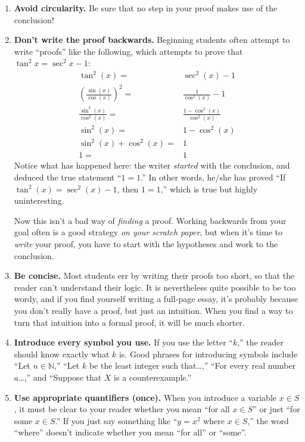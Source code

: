\begin{enumerate}
\item \textbf{Avoid circularity.}  Be sure that no step in your proof makes use of the conclusion!

\item \textbf{Don't write the proof backwards.} Beginning students often attempt to write ``proofs'' like the following, which attempts to prove that \(\tan^2 x  = \sec^2 x - 1\):
\begin{align*}
\tan^2(x) =& \sec^2(x) - 1 \\
\left(\frac{\sin(x)}{\cos(x)}\right)^2 =& \frac{1}{\cos^2(x)} - 1 \\
\frac{\sin^2(x)}{\cos^2(x)} =&  \frac{1-\cos^2(x)}{\cos^2(x)} \\
\sin^2(x) =& 1-\cos^2(x) \\
\sin^2(x) + \cos^2(x) =& 1 \\
1 =& 1
\end{align*}
Notice what has happened here:  the writer \emph{started} with the conclusion, and deduced the true statement ``\(1=1\).'' In other words, he/she has proved ``If \(\tan^2(x) = \sec^2(x) - 1\), then \(1=1\),'' which is true but highly uninteresting.

Now this isn't a bad way of \emph{finding} a proof.
Working backwards from your goal often is a good strategy \emph{on your scratch paper},
but when it's time to \emph{write} your proof,
you have to start with the hypotheses and work to the conclusion.

\item \textbf{Be concise.} Most students err by writing their proofs too short, so that the reader can't understand their logic. It is nevertheless quite possible to be too wordy, and if you find yourself writing a full-page essay, it's probably because you don't really have a proof, but just an intuition. When you find a way to turn that intuition into a formal proof, it will be much shorter.

\item \textbf{Introduce every symbol you use.} If you use the letter ``\(k\),'' the reader should know exactly what \(k\) is. Good phrases for introducing symbols include ``Let \(n\in \mathbb{N}\),'' ``Let \(k\) be the least integer such that\ldots,'' ``For every real number \(a\)\ldots,'' and ``Suppose that \(X\) is a counterexample.''
  
\item \textbf{Use appropriate quantifiers (once).} When you introduce a variable \(x\in S\), it must be clear to your reader whether you mean ``for all \(x\in S\)'' or just ``for some \(x\in S\).'' If you just say something like ``\(y=x^2\) where \(x\in S\),'' the word ``where'' doesn't indicate whether you mean ``for all'' or ``some''.


\end{enumerate}
